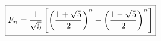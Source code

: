 \documentclass[preview]{standalone}
\begin{document}
\begin{align*}
\special{dvisvgm:raw <g id='unique000'>}\boxed{F_n=\frac{1}{\sqrt5}\left[\left(\frac{1+\sqrt5}{2}\right)^n-\left(\frac{1-\sqrt5}{2}\right)^n\right]}\special{dvisvgm:raw </g>}
\end{align*}
\end{document}
